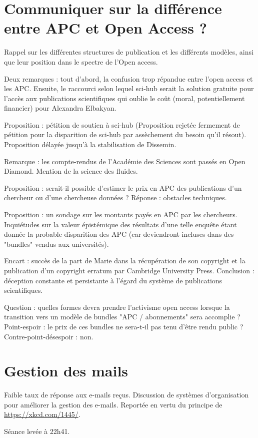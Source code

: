 \documentclass[a4paper]{article}
\begin{document}
\section{Communiquer sur la différence entre APC et Open Access ?}
Rappel sur les différentes structures de publication et les différents modèles, ainsi que leur position dans le spectre de l'Open access.

Deux remarques : tout d'abord, la confusion trop répandue entre l'open access et les APC. Ensuite, le raccourci selon lequel sci-hub serait la solution gratuite pour l'accès aux publications scientifiques qui oublie le coût (moral, potentiellement financier) pour Alexandra Elbakyan. 

Proposition : pétition de soutien à sci-hub 
(Proposition rejetée fermement de pétition pour la disparition de sci-hub par assèchement du besoin qu'il résout).
Proposition délayée jusqu'à la stabilisation de Dissemin. 

Remarque : les compte-rendus de l'Académie des Sciences sont passés en Open Diamond. Mention de la science des fluides. 

Proposition : serait-il possible d'estimer le prix en APC des publications d'un chercheur ou d'une chercheuse données ? Réponse : obstacles techniques. 

Proposition : un sondage sur les montants payés en APC par les chercheurs. Inquiétudes sur la valeur épistémique des résultats d'une telle enquête étant donnée la probable disparition des APC (car deviendront incluses dans des "bundles" vendus aux universités). 

Encart : succès de la part de Marie dans la récupération de son copyright et la publication d'un copyright erratum par Cambridge University Press. 
Conclusion : déception constante et persistante à l'égard du système de publications scientifiques. 

Question : quelles formes devra prendre l'activisme open access lorsque la transition vers un modèle de bundles "APC / abonnements" sera accomplie ? 
Point-espoir : le prix de ces bundles ne sera-t-il pas tenu d'être rendu public ?
Contre-point-désespoir : non.

\section{Gestion des mails}
Faible taux de réponse aux e-mails reçus. Discussion de systèmes d'organisation pour améliorer la gestion des e-mails. Reportée en vertu du principe de \url{https://xkcd.com/1445/}.


Séance levée à 22h41. 
\end{document}

